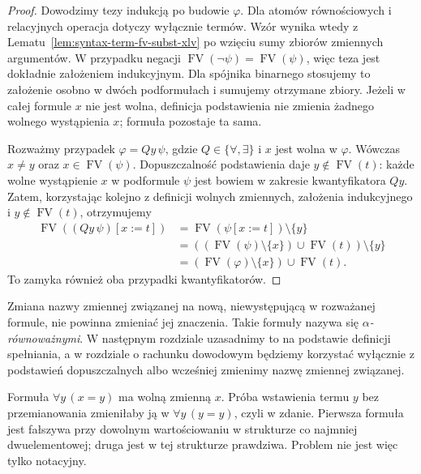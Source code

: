 \begin{proof}
Dowodzimy tezy indukcją po budowie $\varphi$.
Dla atomów równościowych i relacyjnych operacja dotyczy
wyłącznie termów. Wzór wynika wtedy z
Lematu~\ref{lem:syntax-term-fv-subst-xlv} po wzięciu sumy
zbiorów zmiennych argumentów. W przypadku negacji
$\operatorname{FV}(\neg\psi)=\operatorname{FV}(\psi)$,
więc teza jest dokładnie założeniem indukcyjnym.
Dla spójnika binarnego stosujemy to założenie osobno
w dwóch podformułach i sumujemy otrzymane zbiory.
Jeżeli w całej formule $x$ nie jest wolna, definicja
podstawienia nie zmienia żadnego wolnego wystąpienia $x$;
formuła pozostaje ta sama.

Rozważmy przypadek $\varphi=Qy\,\psi$, gdzie
$Q\in\{\forall,\exists\}$ i $x$ jest wolna w $\varphi$.
Wówczas $x\ne y$ oraz $x\in\operatorname{FV}(\psi)$.
Dopuszczalność podstawienia daje
$y\notin\operatorname{FV}(t)$: każde wolne wystąpienie $x$
w podformule $\psi$ jest bowiem w zakresie kwantyfikatora
$Qy$. Zatem, korzystając kolejno z definicji wolnych
zmiennych, założenia indukcyjnego i $y\notin\operatorname{FV}(t)$,
otrzymujemy
\begin{align*}
\operatorname{FV}((Qy\,\psi)[x:=t])
 &=\operatorname{FV}(\psi[x:=t])\setminus\{y\}\\
 &=((\operatorname{FV}(\psi)\setminus\{x\})
    \cup\operatorname{FV}(t))\setminus\{y\}\\
 &=(\operatorname{FV}(\varphi)\setminus\{x\})
    \cup\operatorname{FV}(t).
\end{align*}
To zamyka również oba przypadki kwantyfikatorów.
\end{proof}

\begin{uwaga}
Zmiana nazwy zmiennej związanej na nową, niewystępującą
w rozważanej formule, nie powinna zmieniać jej znaczenia.
Takie formuły nazywa się \emph{$\alpha$-równoważnymi}.
W następnym rozdziale uzasadnimy to na podstawie definicji spełniania,
a w rozdziale o rachunku dowodowym będziemy korzystać wyłącznie
z podstawień dopuszczalnych albo wcześniej zmienimy nazwę zmiennej związanej.
\end{uwaga}

\begin{uwaga}
Formuła $\forall y\,(x=y)$ ma wolną zmienną $x$.
Próba wstawienia termu $y$ bez przemianowania zmieniłaby
ją w $\forall y\,(y=y)$, czyli w zdanie. Pierwsza formuła
jest fałszywa przy dowolnym wartościowaniu w strukturze
co najmniej dwuelementowej; druga jest w tej strukturze
prawdziwa. Problem nie jest więc tylko notacyjny.
\end{uwaga}

